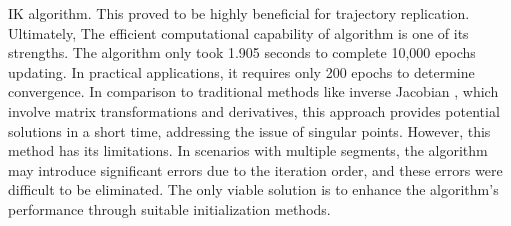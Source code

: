 IK algorithm. This proved to be highly beneficial for trajectory replication. \\
Ultimately, The efficient computational capability of algorithm is one of its strengths. The algorithm only 
took 1.905 seconds to complete 10,000 epochs updating. In practical applications, it requires only 200 epochs 
to determine convergence. In comparison to traditional methods like inverse Jacobian \cite{inverse_jacobian}, 
which involve matrix transformations and derivatives, this approach provides potential solutions in a short 
time, addressing the issue of singular points. However, this method has its limitations. In scenarios with 
multiple segments, the algorithm may introduce significant errors due to the iteration order, and these errors 
were difficult to be eliminated. The only viable solution is to enhance the algorithm's performance through 
suitable initialization methods.
